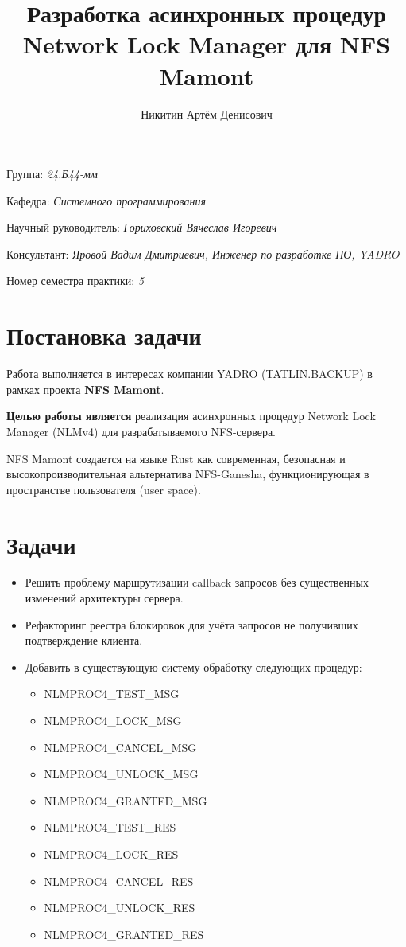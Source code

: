 \documentclass[a4paper]{article}
\title{Разработка асинхронных процедур Network Lock Manager для NFS Mamont}
\author{Никитин Артём Денисович}
\date{}
\begin{document}
\maketitle

\begin{flushright}
    Группа: \emph{24.Б44-мм}

    Кафедра: \emph{Системного программирования}

    Научный руководитель: \emph{Гориховский Вячеслав Игоревич}

    Консультант: \emph{Яровой Вадим Дмитриевич, Инженер по разработке ПО, YADRO}
    
    Номер семестра практики: \emph{5}
\end{flushright} 

\section{Постановка задачи}

Работа выполняется в интересах компании YADRO (TATLIN.BACKUP) в рамках проекта \textbf{NFS Mamont}.

\textbf{Целью работы является} реализация асинхронных процедур Network Lock Manager (NLMv4) для разрабатываемого NFS-сервера.

NFS Mamont создается на языке Rust как современная, безопасная и высокопроизводительная альтернатива NFS-Ganesha, функционирующая в пространстве пользователя (user space).

\section{Задачи}

\begin{itemize}
    \item Решить проблему маршрутизации callback запросов без существенных изменений архитектуры сервера.
    \item Рефакторинг реестра блокировок для учёта запросов не получивших подтверждение клиента.
    \item Добавить в существующую систему обработку следующих процедур:
    \begin{itemize}
        \item NLMPROC4\_TEST\_MSG
        \item NLMPROC4\_LOCK\_MSG
        \item NLMPROC4\_CANCEL\_MSG
        \item NLMPROC4\_UNLOCK\_MSG
        \item NLMPROC4\_GRANTED\_MSG
        \item NLMPROC4\_TEST\_RES
        \item NLMPROC4\_LOCK\_RES
        \item NLMPROC4\_CANCEL\_RES
        \item NLMPROC4\_UNLOCK\_RES
        \item NLMPROC4\_GRANTED\_RES
    \end{itemize}
\end{itemize}
\end{document}
